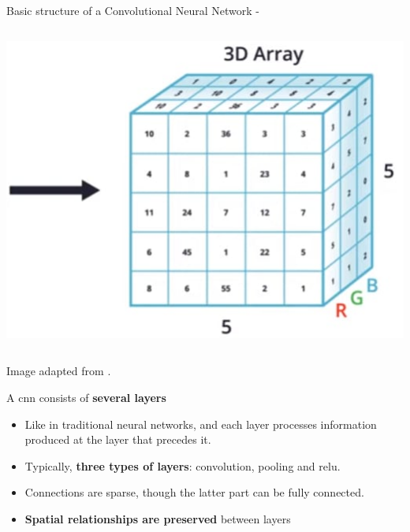\begin{frame}[t,allowframebreaks]{Basic structure of a Convolutional Neural Network -}
\begin{columns}
\begin{column}{0.32\textwidth}
            \begin{center}
                \includegraphics[width=1.0\textwidth]
                  {./images/cnn/example_inputs/example_1_cat_array.png}\\
            \end{center}      
        \end{column}
    \end{columns}
    \begin{center}
        {\scriptsize 
        \color{col:attribution} 
        Image adapted from \cite{DevCommunity:GoingFurtherWithCNN}.}\\
    \end{center}      

    \framebreak

    A \gls{cnn} consists of {\bf several layers}

    \begin{itemize}
        \item
            Like in traditional  neural networks, 
            and each layer processes information produced at the layer that precedes it.
        \item
            Typically, {\bf three types of layers}:
            \gls{convolution}, 
            \gls{pooling} and 
            \gls{relu}.
        \item
            Connections are sparse, though the latter part can be fully connected.
        \item
            {\bf Spatial relationships are preserved} between layers
    \end{itemize}


\end{frame}
